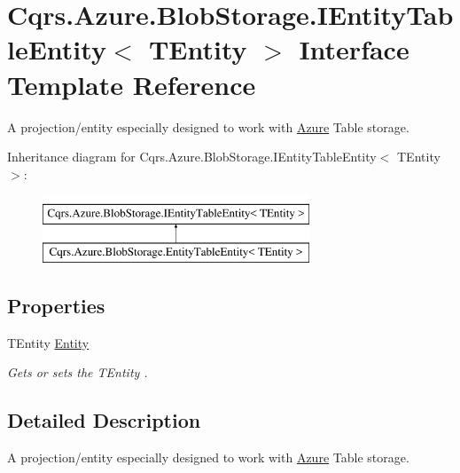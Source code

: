 \hypertarget{interfaceCqrs_1_1Azure_1_1BlobStorage_1_1IEntityTableEntity}{}\section{Cqrs.\+Azure.\+Blob\+Storage.\+I\+Entity\+Table\+Entity$<$ T\+Entity $>$ Interface Template Reference}
\label{interfaceCqrs_1_1Azure_1_1BlobStorage_1_1IEntityTableEntity}


A projection/entity especially designed to work with \hyperlink{namespaceCqrs_1_1Azure}{Azure} Table storage.  


Inheritance diagram for Cqrs.\+Azure.\+Blob\+Storage.\+I\+Entity\+Table\+Entity$<$ T\+Entity $>$\+:\begin{figure}[H]
\begin{center}
\leavevmode
\includegraphics[height=2.000000cm]{interfaceCqrs_1_1Azure_1_1BlobStorage_1_1IEntityTableEntity}
\end{center}
\end{figure}
\subsection*{Properties}
\begin{DoxyCompactItemize}
\item 
T\+Entity \hyperlink{interfaceCqrs_1_1Azure_1_1BlobStorage_1_1IEntityTableEntity_a06bd38e994772fa43bf8f456c1b3d6e2_a06bd38e994772fa43bf8f456c1b3d6e2}{Entity}
\begin{DoxyCompactList}\small\item\em Gets or sets the {\itshape T\+Entity} . \end{DoxyCompactList}\end{DoxyCompactItemize}


\subsection{Detailed Description}
A projection/entity especially designed to work with \hyperlink{namespaceCqrs_1_1Azure}{Azure} Table storage. 



